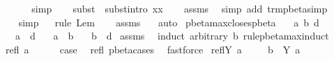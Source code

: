 \begin{isabellebody}
\ \ \isamarkupfalse%
\ {}\ \isamarkupfalse%
\ simp\isanewline
\ \ \isamarkupfalse%
\ {\isacharparenleft}subst\ {\isacharparenleft}{}{\isacharparenright}\ subst{\isacharunderscore}intro{}{\isacharbrackleft}\ x{\isacharequal}x{\isacharbrackright}{\isacharparenright}\isanewline
\ \ \isamarkupfalse%
\ assms{\isacharparenleft}{}{\isacharparenright}\ \isamarkupfalse%
\ {\isacharparenleft}simp\ add{\isacharcolon}\ trm{\isacharunderscore}pbeta{\isacharunderscore}simp{}{\isacharparenright}\isanewline
\ \ \isamarkupfalse%
\ {}\ \isamarkupfalse%
\ simp\isanewline
\ \ \isamarkupfalse%
{\isacharparenleft}rule\ Lem{}{\isacharunderscore}{}{\isacharunderscore}{}{\isacharparenright}\isanewline
\ \ \isamarkupfalse%
\ assms\ {}\ \isamarkupfalse%
\ auto\isanewline
{}\isamarkupfalse%
%
\endisatagproof
{\isafoldproof}%
%
\isadelimproof
\isanewline
%
\endisadelimproof
\isanewline
{}\isamarkupfalse%
\ pbeta{\isacharunderscore}max{\isacharunderscore}closes{\isacharunderscore}pbeta{\isacharcolon}\isanewline
\ \ \ a\ b\ d\isanewline
\ \ \ {\isachardoublequoteopen}a\ {\isachargreater}{\isachargreater}{\isachargreater}\ d{\isachardoublequoteclose}\isanewline
\ \ \ {\isachardoublequoteopen}a\ {\isasymggreater}\ b{\isachardoublequoteclose}\isanewline
\ \ \ {\isachardoublequoteopen}b\ {\isasymggreater}\ d{\isachardoublequoteclose}\isanewline
%
\isadelimproof
%
\endisadelimproof
%
\isatagproof
{}\isamarkupfalse%
\ assms\ \isamarkupfalse%
\ {\isacharparenleft}induct\ arbitrary{\isacharcolon}\ b\ rule{\isacharcolon}pbeta{\isacharunderscore}max{\isachardot}induct{\isacharparenright}\isanewline
{}\isamarkupfalse%
\ {\isacharparenleft}refl\ a{\isacharparenright}\ \ \isanewline
\ \ \isamarkupfalse%
\ {\isacharquery}case\ \isamarkupfalse%
\ refl\ pbeta{\isachardot}cases\ \isamarkupfalse%
\ fastforce\isanewline
{}\isamarkupfalse%
\isanewline
{}\isamarkupfalse%
\ {\isacharparenleft}reflY\ a{\isacharparenright}\ \isamarkupfalse%
\ \isamarkupfalse%
\ {}{\isacharcolon}\ {\isachardoublequoteopen}b\ {\isacharequal}\ Y\ a{\isachardoublequoteclose}\ \isamarkupfalse%

\end{isabellebody}
